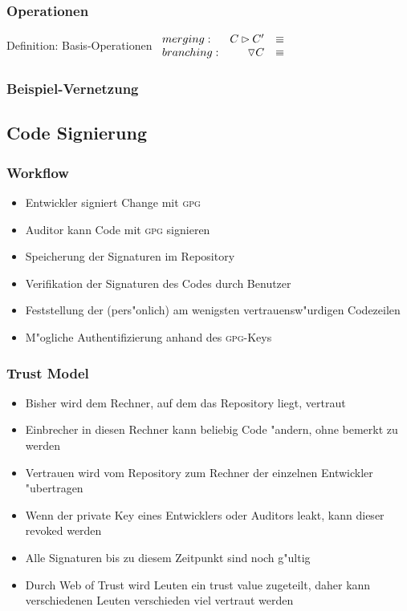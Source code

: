 \documentclass[german]{beamer}
\newcommand{\GPG}{\textsc{gpg}}
\begin{document}
\begin{frame}
  \frametitle{Operationen}

  \begin{block}{Definition: Basis-Operationen}
    \medskip
    $\begin{array}{lrcl}
    \mathnormal{merging}:   & C \rhd C'       & \equiv \\
    \mathnormal{branching}: & \triangledown C & \equiv
    \end{array}$
  \end{block}
  
\end{frame}

\begin{frame}
  \frametitle{Beispiel-Vernetzung}

\end{frame}

\subsection{Code Signierung}

\begin{frame}
  \frametitle{Workflow}
  \begin{itemize}
  \item Entwickler signiert Change mit \GPG
  \item Auditor kann Code mit \GPG{} signieren
  \item Speicherung der Signaturen im Repository
  \item Verifikation der Signaturen des Codes durch Benutzer
  \item Feststellung der (pers"onlich)
    am wenigsten vertrauensw"urdigen Codezeilen
  \item M"ogliche Authentifizierung anhand des \GPG{}-Keys
  \end{itemize}

\end{frame}
\begin{frame}
  \frametitle{Trust Model}
  \begin{itemize}
  \item Bisher wird dem Rechner, auf dem das Repository liegt, vertraut
  \item Einbrecher in diesen Rechner kann beliebig Code "andern,
    ohne bemerkt zu werden
  \item Vertrauen wird vom Repository zum Rechner
    der einzelnen Entwickler "ubertragen
  \item Wenn der private Key eines Entwicklers oder Auditors
    leakt, kann dieser revoked werden
  \item Alle Signaturen bis zu diesem Zeitpunkt sind noch g"ultig
  \item Durch Web of Trust wird Leuten ein trust value zugeteilt,
    daher kann verschiedenen Leuten verschieden viel vertraut werden
  \end{itemize}
\end{frame}
\end{document}
